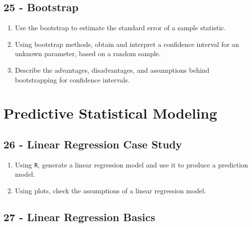 \documentclass[
  letterpaper,
  DIV=11,
  numbers=noendperiod]{scrreprt}
\begin{document}
\subsection*{25 - Bootstrap}\label{bootstrap}

\begin{enumerate}
\def\labelenumi{\arabic{enumi})}
\item
  Use the bootstrap to estimate the standard error of a sample
  statistic.
\item
  Using bootstrap methods, obtain and interpret a confidence interval
  for an unknown parameter, based on a random sample.
\item
  Describe the advantages, disadvantages, and assumptions behind
  bootstrapping for confidence intervals.
\end{enumerate}

\section*{Predictive Statistical
Modeling}\label{predictive-statistical-modeling}


\subsection*{26 - Linear Regression Case
Study}\label{linear-regression-case-study}

\begin{enumerate}
\def\labelenumi{\arabic{enumi})}
\item
  Using \texttt{R}, generate a linear regression model and use it to
  produce a prediction model.
\item
  Using plots, check the assumptions of a linear regression model.
\end{enumerate}

\subsection*{27 - Linear Regression
Basics}\label{linear-regression-basics}
\end{document}
